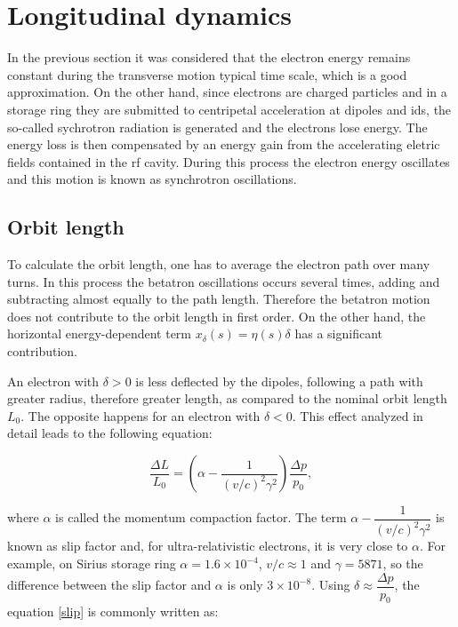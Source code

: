\section{Longitudinal dynamics}\label{longitudinal}

In the previous section it was considered that the electron energy remains constant during the transverse motion typical time scale, which is a good approximation. On the other hand, since electrons are charged particles and in a storage ring they are submitted to centripetal acceleration at dipoles and \gls{id}s, the so-called sychrotron radiation is generated and the electrons lose energy. The energy loss is then compensated by an energy gain from the accelerating eletric fields contained in the \gls{rf} cavity. During this process the electron energy oscillates and this motion is known as synchrotron oscillations.

\subsection{Orbit length}

To calculate the orbit length, one has to average the electron path over many turns. In this process the betatron oscillations occurs several times, adding and subtracting almost equally to the path length. Therefore the betatron motion does not contribute to the orbit length in first order. On the other hand, the horizontal energy-dependent term $x_{\delta}(s) = \eta(s) \delta$ has a significant contribution. 

An electron with $\delta > 0$ is less deflected by the dipoles, following a path with greater radius, therefore greater length, as compared to the nominal orbit length $L_0$. The opposite happens for an electron with $\delta < 0$. This effect analyzed in detail leads to the following equation:

\begin{equation}
    \frac{\Delta L}{L_0} = \left(\alpha - \dfrac{1}{(v/c)^2\gamma^2}\right) \dfrac{\Delta p}{p_0},
    \label{slip}
\end{equation}

where $\alpha$ is called the momentum compaction factor. The term $\alpha - \dfrac{1}{(v/c)^2\gamma^2}$ is known as slip factor and, for ultra-relativistic electrons, it is very close to $\alpha$. For example, on Sirius storage ring $\alpha = 1.6 \times 10^{-4}$, $v/c \approx 1$ and $\gamma = 5871$, so the difference between the slip factor and $\alpha$ is only $3 \times 10^{-8}$. Using $\delta \approx \dfrac{\Delta p}{p_0}$, the equation \eqref{slip} is commonly written as:

